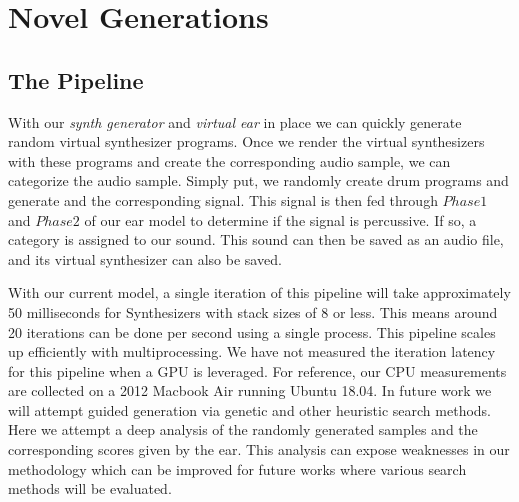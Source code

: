 \documentclass[\main/thesis.tex]{subfiles}
\begin{document}
\chapter{Novel Generations}

\label{gens}
\section{The Pipeline}
 With our \emph{synth generator} and \emph{virtual ear} in place we can quickly generate random virtual synthesizer programs. Once we render the virtual synthesizers with these programs and create the corresponding audio sample, we can categorize the audio sample. Simply put, we randomly create drum programs and generate and the corresponding signal. This signal is then fed through $Phase 1$ and $Phase 2$ of our ear model to determine if the signal is percussive. If so, a category is assigned to our sound. This sound can then be saved as an audio file, and its virtual synthesizer can also be saved.
 
 With our current model, a single iteration of this pipeline will take approximately 50 milliseconds for Synthesizers with stack sizes of 8 or less. This means around 20 iterations can be done per second using a single process. This pipeline scales up efficiently with multiprocessing. We have not measured the iteration latency for this pipeline when a GPU is leveraged. For reference, our CPU measurements are collected on a 2012 Macbook Air running Ubuntu 18.04.
 In future work we will attempt guided generation via genetic and other heuristic search methods. Here we attempt a deep analysis of the randomly generated samples and the corresponding scores given by the ear. This analysis can expose weaknesses in our methodology which can be improved for future works where various search methods will be evaluated.
  
\end{document}
